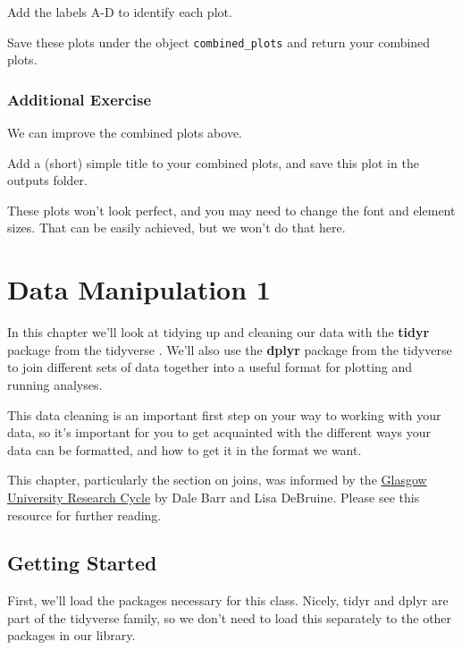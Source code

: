 \documentclass[
]{book}
\begin{document}
Add the labels A-D to identify each plot.

Save these plots under the object \texttt{combined\_plots} and return your combined plots.

\hypertarget{additional-exercise-1}{%
\subsection{Additional Exercise}\label{additional-exercise-1}}

We can improve the combined plots above.

Add a (short) simple title to your combined plots, and save this plot in the outputs folder.

These plots won't look perfect, and you may need to change the font and element sizes. That can be easily achieved, but we won't do that here.

\hypertarget{data-manipulation-1}{%
\chapter{Data Manipulation 1}\label{data-manipulation-1}}

In this chapter we'll look at tidying up and cleaning our data with the \textbf{tidyr} package \citep{R-tidyr} from the tidyverse \citep{R-tidyverse}. We'll also use the \textbf{dplyr} package \citep{R-dplyr} from the tidyverse \citep{R-tidyverse} to join different sets of data together into a useful format for plotting and running analyses.

This data cleaning is an important first step on your way to working with your data, so it's important for you to get acquainted with the different ways your data can be formatted, and how to get it in the format we want.

This chapter, particularly the section on joins, was informed by the \href{https://gupsych.github.io/research_cycle/}{Glasgow University Research Cycle} by Dale Barr and Lisa DeBruine. Please see this resource for further reading.

\hypertarget{getting-started-1}{%
\section{Getting Started}\label{getting-started-1}}

First, we'll load the packages necessary for this class. Nicely, tidyr and dplyr are part of the tidyverse family, so we don't need to load this separately to the other packages in our library.
\end{document}
